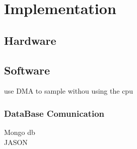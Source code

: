 \chapter{Implementation}
\section{Hardware}

\section{Software}

use DMA to sample withou using the cpu
\subsection{DataBase Comunication}
Mongo db \\
JASON